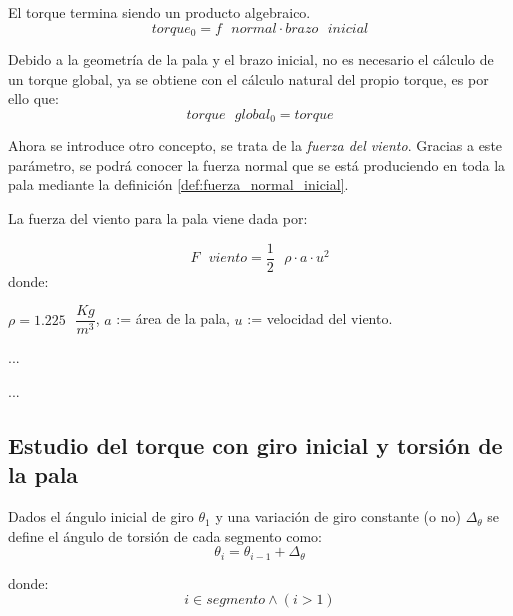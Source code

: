   \begin{definicion}
  El torque termina siendo un producto algebraico.
 $$ torque_0 = f \text{ } normal \cdot brazo \text{ } inicial$$
 \label{def:torque_algebraico_inicial}
 \end{definicion}
 
   \begin{definicion}
Debido a la geometría de la pala y el brazo inicial, no es necesario el cálculo de un torque global, ya se obtiene con el cálculo natural del propio torque, es por ello que:
 $$ torque \text{ } global_0 = torque$$
 \label{def:torque_global_inicial}
 \end{definicion}
 
 
 Ahora se introduce otro concepto, se trata de la \textit{fuerza del viento}. Gracias a este parámetro, se podrá conocer la fuerza normal que se está produciendo en toda la pala mediante la definición \ref{def:fuerza_normal_inicial}.
 
 \begin{definicion}
 La fuerza del viento para la pala viene dada por:
 
 $$ F \text{ } viento = \dfrac{1}{2} \text{ } \rho \cdot a \cdot u^2$$
 donde:
 
  \centering  $\rho = 1.225 \text{ } \dfrac{Kg}{m^3}$, $a$ := área de la pala, $u$ := velocidad del viento.
 \label{def:fuerza_viento_inicial}
 \end{definicion}
 
 
 
 ...\vspace{400}
 











...
\subsection{Estudio del torque con giro inicial y torsión de la pala}
\label{section:torque_giro_torsion}


\begin{definicion}
Dados el ángulo inicial de giro $\theta_1 $ y una variación de giro constante (o no) $\Delta_\theta$ se define el ángulo de torsión de cada segmento como:
$$\theta_i = \theta_{i-1} + \Delta_\theta$$ 

    donde:
 $$i \in segmento \wedge (i > 1)$$
 
\label{def:theta_cte}
\end{definicion}



